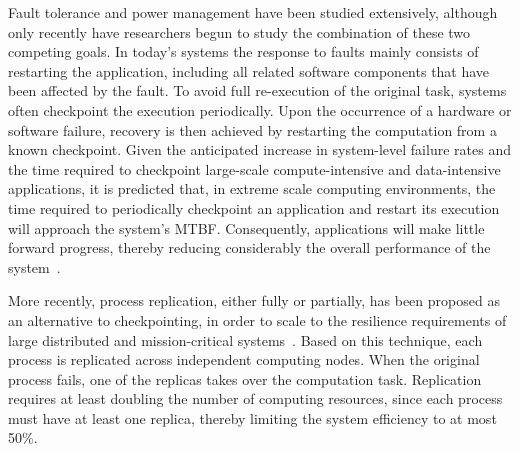 Fault tolerance and power management have been studied extensively, although only recently have researchers begun to study the combination of these two competing goals. In today's systems the response to faults mainly consists of restarting the application, including all related software components that have been affected by the fault. To avoid full re-execution of the original task, systems often checkpoint the execution periodically. Upon the occurrence of a hardware or software failure, recovery is then achieved by restarting the computation from a known checkpoint. Given the anticipated increase in system-level failure rates and the time required to checkpoint large-scale compute-intensive and data-intensive applications, it is predicted that, in extreme scale computing environments, the time required to periodically checkpoint an application and restart its execution will approach the system's MTBF. Consequently, applications will make little forward progress, thereby reducing considerably the overall performance of the system~\cite{riesen_sandia_2010}.%

More recently, process replication, either fully or partially, has been proposed as an alternative to checkpointing, in order to scale to the resilience requirements of large distributed and mission-critical systems~\cite{fiala_2012_sdc,riesen_sandia_2010}. Based on this technique, each process is replicated across independent computing
nodes. When the original process fails, one of the replicas takes over the computation task. Replication 
requires at least doubling the number of computing resources, since each process must have at least one replica, thereby 
limiting the system efficiency to at most 50\%.

